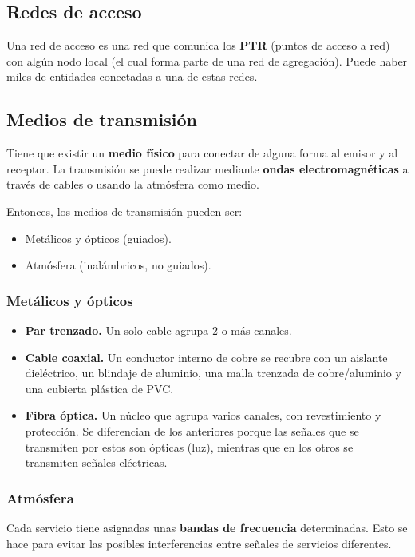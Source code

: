 \documentclass[a4paper]{book}
\numberwithin{figure}{chapter}
\numberwithin{equation}{subsection}
\begin{document}
\subsection{Redes de acceso}
Una red de acceso es una red que comunica los \textbf{PTR} (puntos de acceso a red) con algún nodo local (el cual forma parte de una red de agregación). Puede haber miles de entidades conectadas a una de estas redes.

\subsection{Medios de transmisión}
Tiene que existir un \textbf{medio físico} para conectar de alguna forma al emisor y al receptor. La transmisión se puede realizar mediante \textbf{ondas electromagnéticas} a través de cables o usando la atmósfera como medio.

Entonces, los medios de transmisión pueden ser:
\begin{itemize}
  \item Metálicos y ópticos (guiados).
  \item Atmósfera (inalámbricos, no guiados).
\end{itemize}

\subsubsection{Metálicos y ópticos}
\vspace{1.5\parskip}
\begin{itemize}
  \item \textbf{Par trenzado.} Un solo cable agrupa 2 o más canales.
  \item \textbf{Cable coaxial.} Un conductor interno de cobre se recubre con un aislante dieléctrico, un blindaje de aluminio, una malla trenzada de cobre/aluminio y una cubierta plástica de PVC.
  \item \textbf{Fibra óptica.} Un núcleo que agrupa varios canales, con revestimiento y protección. Se diferencian de los anteriores porque las señales que se transmiten por estos son ópticas (luz), mientras que en los otros se transmiten señales eléctricas.
\end{itemize}

\subsubsection{Atmósfera}
Cada servicio tiene asignadas unas \textbf{bandas de frecuencia} determinadas. Esto se hace para evitar las posibles interferencias entre señales de servicios diferentes.
\end{document}
